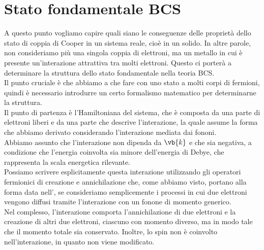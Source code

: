 \section{Stato fondamentale BCS}
A questo punto vogliamo capire quali siano le conseguenze delle proprietà dello stato di coppia di Cooper in un sistema reale, cioè in un solido. In altre parole, non consideriamo più una singola coppia di elettroni, ma un metallo in cui è presente un'interazione attrattiva tra molti elettroni. Questo ci porterà a determinare la struttura dello stato fondamentale nella teoria BCS.\\
Il punto cruciale è che abbiamo a che fare con uno stato a molti corpi di fermioni, quindi è necessario introdurre un certo formalismo matematico per determinarne la struttura.\\
Il punto di partenza è l'Hamiltoniana del sistema, che è composta da una parte di elettroni liberi e da una parte che descrive l'interazione, la quale assume la forma che abbiamo derivato considerando l'interazione mediata dai fononi.\\
Abbiamo assunto che l'interazione non dipenda da $\vb{k}$ e che sia negativa, a condizione che l'energia coinvolta sia minore dell'energia di Debye, che rappresenta la scala energetica rilevante.\\
Possiamo scrivere esplicitamente questa interazione utilizzando gli operatori fermionici di creazione e annichilazione che, come abbiamo visto, portano alla forma data nell', se consideriamo semplicemente i processi in cui due elettroni vengono diffusi tramite l'interazione con un fonone di momento generico.\\
Nel complesso, l'interazione comporta l'annichilazione di due elettroni e la creazione di altri due elettroni, ciascuno con momento diverso, ma in modo tale che il momento totale sia conservato. Inoltre, lo spin non è coinvolto nell'interazione, in quanto non viene modificato.
